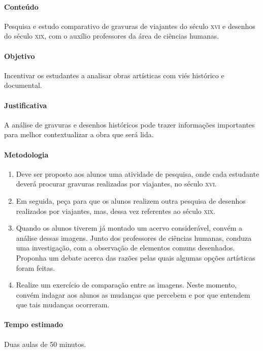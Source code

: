 \documentclass[12pt]{extarticle}
\begin{document}
\paragraph{Conteúdo} Pesquisa e estudo comparativo de gravuras de viajantes do século \textsc{xvi} e desenhos do século \textsc{xix}, 
com o auxílio professores da área de ciências humanas.

\paragraph{Objetivo} Incentivar os estudantes a analisar obras artísticas com viés histórico e documental.

\paragraph{Justificativa} A análise de gravuras e desenhos históricos pode trazer informações importantes para melhor contextualizar a obra que será lida.

\paragraph{Metodologia}

\begin{enumerate}

\item Deve ser proposto aos alunos uma atividade de pesquisa,
onde cada estudante deverá procurar gravuras realizadas por viajantes,
no século \textsc{xvi}.

\item Em seguida, peça para que os alunos realizem outra pesquisa de
desenhos realizados por viajantes, mas, dessa vez referentes ao século
\textsc{xix}.

\item  Quando os alunos tiverem já montado um acervo
considerável, convém a análise dessas imagens. Junto dos professores
de ciências humanas, conduza uma investigação, com a observação de elementos comuns desenhados. 
Proponha um debate acerca das razões pelas quais algumas opções artísticas foram feitas.

\item  Realize um exercício de comparação entre as imagens. Neste momento,
convém indagar aos alunos as mudanças que percebem e por que entendem
que tais mudanças ocorreram.

\end{enumerate}

\paragraph{Tempo estimado} Duas aulas de 50 minutos.
\end{document}
